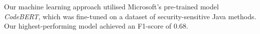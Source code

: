 \documentclass[12pt]{report}
\begin{document}
\noindent
Our machine learning approach utilised Microsoft's pre-trained model \emph{CodeBERT}, which was fine-tuned on a dataset of security-sensitive Java methods. Our highest-performing model achieved an F1-score of $0.68$.



%
%
%



\end{document}
